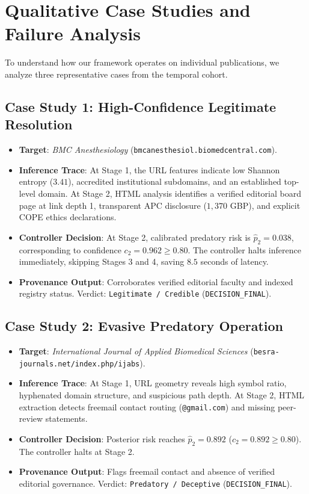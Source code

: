 \documentclass[journal]{IEEEtran}
\begin{document}
\section{Qualitative Case Studies and Failure Analysis}

To understand how our framework operates on individual publications, we analyze three representative cases from the temporal cohort.

\subsection{Case Study 1: High-Confidence Legitimate Resolution}
\begin{itemize}
    \item \textbf{Target}: \textit{BMC Anesthesiology} (\texttt{bmcanesthesiol.biomedcentral.com}).
    \item \textbf{Inference Trace}: At Stage 1, the URL features indicate low Shannon entropy ($3.41$), accredited institutional subdomains, and an established top-level domain. At Stage 2, HTML analysis identifies a verified editorial board page at link depth 1, transparent APC disclosure ($1,370$ GBP), and explicit COPE ethics declarations.
    \item \textbf{Controller Decision}: At Stage 2, calibrated predatory risk is $\hat{p}_2 = 0.038$, corresponding to confidence $c_2 = 0.962 \ge 0.80$. The controller halts inference immediately, skipping Stages 3 and 4, saving $8.5$ seconds of latency.
    \item \textbf{Provenance Output}: Corroborates verified editorial faculty and indexed registry status. Verdict: \texttt{Legitimate / Credible} (\texttt{DECISION\_FINAL}).
\end{itemize}

\subsection{Case Study 2: Evasive Predatory Operation}
\begin{itemize}
    \item \textbf{Target}: \textit{International Journal of Applied Biomedical Sciences} (\texttt{besra-journals.net/index.php/ijabs}).
    \item \textbf{Inference Trace}: At Stage 1, URL geometry reveals high symbol ratio, hyphenated domain structure, and suspicious path depth. At Stage 2, HTML extraction detects freemail contact routing (\texttt{@gmail.com}) and missing peer-review statements.
    \item \textbf{Controller Decision}: Posterior risk reaches $\hat{p}_2 = 0.892$ ($c_2 = 0.892 \ge 0.80$). The controller halts at Stage 2.
    \item \textbf{Provenance Output}: Flags freemail contact and absence of verified editorial governance. Verdict: \texttt{Predatory / Deceptive} (\texttt{DECISION\_FINAL}).
\end{itemize}
\end{document}
